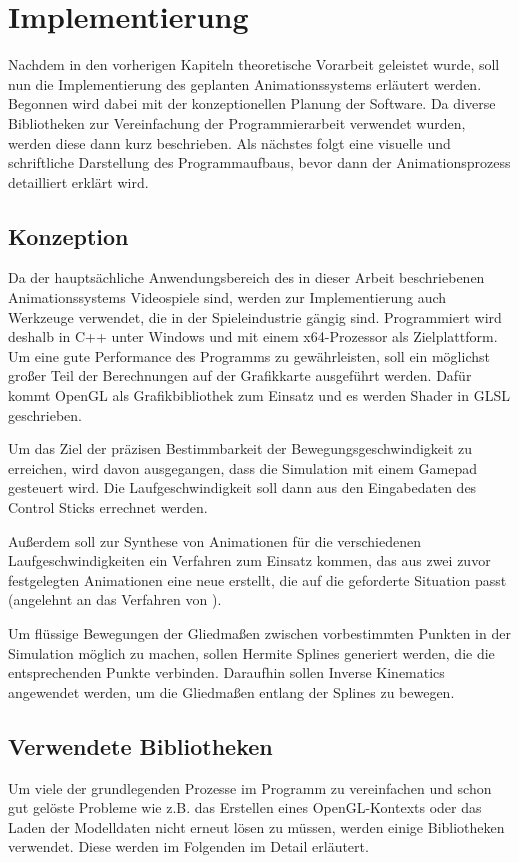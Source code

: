 \chapter{Implementierung} \label{implementierung}
Nachdem in den vorherigen Kapiteln theoretische Vorarbeit geleistet wurde, soll nun die Implementierung des geplanten Animationssystems erläutert werden. Begonnen wird dabei mit der konzeptionellen Planung der Software. Da diverse Bibliotheken zur Vereinfachung der Programmierarbeit verwendet wurden, werden diese dann kurz beschrieben. Als nächstes folgt eine visuelle und schriftliche Darstellung des Programmaufbaus, bevor dann der Animationsprozess detailliert erklärt wird.


\section{Konzeption}
Da der hauptsächliche Anwendungsbereich des in dieser Arbeit beschriebenen Animationssystems Videospiele sind, werden zur Implementierung auch Werkzeuge verwendet, die in der Spieleindustrie gängig sind. Programmiert wird deshalb in C++ unter Windows und mit einem x64-Prozessor als Zielplattform. Um eine gute Performance des Programms zu gewährleisten, soll ein möglichst großer Teil der Berechnungen auf der Grafikkarte ausgeführt werden. Dafür kommt OpenGL als Grafikbibliothek zum Einsatz und es werden Shader in GLSL geschrieben.

Um das Ziel der präzisen Bestimmbarkeit der Bewegungsgeschwindigkeit zu erreichen, wird davon ausgegangen, dass die Simulation mit einem Gamepad gesteuert wird. Die Laufgeschwindigkeit soll dann aus den Eingabedaten des Control Sticks errechnet werden.

Außerdem soll zur Synthese von Animationen für die verschiedenen Laufgeschwindigkeiten ein Verfahren zum Einsatz kommen, das aus zwei zuvor festgelegten Animationen eine neue erstellt, die auf die geforderte Situation passt (angelehnt an das Verfahren von \cite{johansen2009automated}).

Um flüssige Bewegungen der Gliedmaßen zwischen vorbestimmten Punkten in der Simulation möglich zu machen, sollen Hermite Splines generiert werden, die die entsprechenden Punkte verbinden. Daraufhin sollen Inverse Kinematics angewendet werden, um die Gliedmaßen entlang der Splines zu bewegen.

\section{Verwendete Bibliotheken}
Um viele der grundlegenden Prozesse im Programm zu vereinfachen und schon gut gelöste Probleme wie z.B. das Erstellen eines OpenGL-Kontexts oder das Laden der Modelldaten nicht erneut lösen zu müssen, werden einige Bibliotheken verwendet. Diese werden im Folgenden im Detail erläutert.

